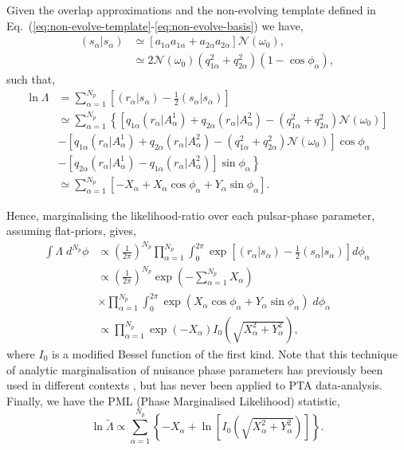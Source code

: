 \documentclass[prd,twocolumn,showpacs,nofootinbib]{revtex4}
\begin{document}
Given the overlap approximations and the non-evolving template defined in Eq.\ (\ref{eq:non-evolve-template}-\ref{eq:non-evolve-basis}) we have,
\begin{align}
(s_{\alpha}|s_{\alpha}) &\simeq \left[a_{1{\alpha}}a_{1{\alpha}} + a_{2{\alpha}}a_{2{\alpha}}\right]\mathcal{N}(\omega_0), \nonumber\\
&\simeq 2\mathcal{N}(\omega_0)\left(q_{1\alpha}^2+q_{2\alpha}^2\right)\left(1-\cos\phi_{\alpha}\right),
\end{align}
such that,
\begin{align} \label{eq:collapsedlnlambda}
\ln\Lambda &= \sum_{\alpha=1}^{N_p} \left[(r_{\alpha}|s_{\alpha}) - \frac{1}{2}(s_{\alpha}|s_{\alpha})\right]  \nonumber\\
&\simeq \sum_{\alpha=1}^{N_p} \left\{\left[q_{1\alpha}(r_{\alpha}|A^1_{\alpha})+q_{2\alpha}(r_{\alpha}|A^2_{\alpha}) - \left(q_{1\alpha}^2+q_{2\alpha}^2\right)\mathcal{N}(\omega_0)\right]\right. \nonumber\\
&- \left[q_{1\alpha}(r_{\alpha}|A^1_{\alpha})+q_{2\alpha}(r_{\alpha}|A^2_{\alpha}) - \left(q_{1\alpha}^2+q_{2\alpha}^2\right)\mathcal{N}(\omega_0)\right]\cos\phi_{\alpha}  \nonumber\\
&\left. - \left[q_{2\alpha}(r_{\alpha}|A^1_{\alpha})-q_{1\alpha}(r_{\alpha}|A^2_{\alpha})\right]\sin\phi_{\alpha}\right\}\nonumber\\
&\simeq \sum_{\alpha=1}^{N_p}\left[ -X_{\alpha} + X_{\alpha}\cos\phi_{\alpha} + Y_{\alpha}\sin\phi_{\alpha}\right].
\end{align}

Hence, marginalising the likelihood-ratio over each pulsar-phase parameter, assuming flat-priors, gives,
\begin{align}
\int\Lambda\;d^{N_p}\phi &\propto \left(\frac{1}{2\pi}\right)^{N_p}\prod_{\alpha=1}^{N_p}\int_0^{2\pi}\exp[(r_{\alpha}|s_{\alpha})-\frac{1}{2}(s_{\alpha}|s_{\alpha})]d\phi_{\alpha} \nonumber\\
&\propto \left(\frac{1}{2\pi}\right)^{N_p}\exp\left(-\sum_{\alpha=1}^{N_p}X_{\alpha}\right) \nonumber\\
&\times\prod_{\alpha=1}^{N_p}\int_0^{2\pi}\exp(X_{\alpha}\cos\phi_{\alpha}+Y_{\alpha}\sin\phi_{\alpha})\;d\phi_{\alpha} \nonumber\\
&\propto \prod_{\alpha=1}^{N_p}\exp(-X_{\alpha})I_0\left(\sqrt{X_{\alpha}^2+Y_{\alpha}^2}\right),
\end{align}
where $I_0$ is a modified Bessel function of the first kind. Note that this technique of analytic marginalisation of nuisance phase parameters has previously been used in different contexts \citep{whalen1971detection,F-and-G}, but has never been applied to PTA data-analysis. Finally, we have the PML (Phase Marginalised Likelihood) statistic,
\begin{equation}
\ln\tilde\Lambda \propto \sum_{\alpha=1}^{N_p}\left\{-X_{\alpha} + \ln\left[I_0\left(\sqrt{X_{\alpha}^2+Y_{\alpha}^2}\right)\right]\right\}.
\end{equation}
\end{document}
